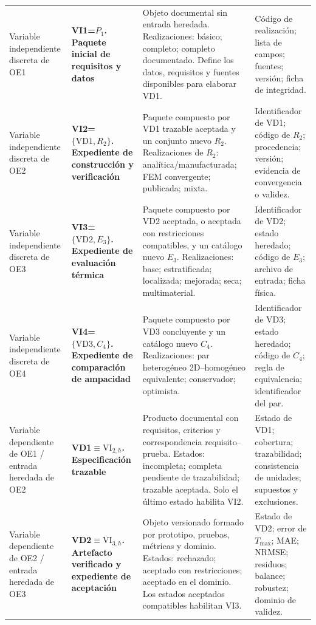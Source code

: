 \documentclass[11pt,a4paper,oneside]{report}
\newcommand{\Tmax}{T_{\max}}
\begin{document}
\begin{singlespace}
\begin{landscape}
\begin{longtable}{L{4.00cm}L{4.20cm}L{8.20cm}L{6.30cm}}
Variable independiente discreta de OE1 & \textbf{VI1=$P_1$. Paquete inicial de requisitos y datos} & Objeto documental sin entrada heredada. Realizaciones: básico; completo; completo documentado. Define los datos, requisitos y fuentes disponibles para elaborar VD1. & Código de realización; lista de campos; fuentes; versión; ficha de integridad. \\

Variable independiente discreta de OE2 & \textbf{VI2=$\{\mathrm{VD1},R_2\}$. Expediente de construcción y verificación} & Paquete compuesto por VD1 trazable aceptada y un conjunto nuevo $R_2$. Realizaciones de $R_2$: analítica/manufacturada; FEM convergente; publicada; mixta. & Identificador de VD1; código de $R_2$; procedencia; versión; evidencia de convergencia o validez. \\

Variable independiente discreta de OE3 & \textbf{VI3=$\{\mathrm{VD2},E_3\}$. Expediente de evaluación térmica} & Paquete compuesto por VD2 aceptada, o aceptada con restricciones compatibles, y un catálogo nuevo $E_3$. Realizaciones: base; estratificada; localizada; mejorada; seca; multimaterial. & Identificador de VD2; estado heredado; código de $E_3$; archivo de entrada; ficha física. \\

Variable independiente discreta de OE4 & \textbf{VI4=$\{\mathrm{VD3},C_4\}$. Expediente de comparación de ampacidad} & Paquete compuesto por VD3 concluyente y un catálogo nuevo $C_4$. Realizaciones: par heterogéneo 2D--homogéneo equivalente; conservador; optimista. & Identificador de VD3; estado heredado; código de $C_4$; regla de equivalencia; identificador del par. \\

Variable dependiente de OE1 / entrada heredada de OE2 & \textbf{VD1$\equiv\mathrm{VI}_{2,h}$. Especificación trazable} & Producto documental con requisitos, criterios y correspondencia requisito--prueba. Estados: incompleta; completa pendiente de trazabilidad; trazable aceptada. Solo el último estado habilita VI2. & Estado de VD1; cobertura; trazabilidad; consistencia de unidades; supuestos y exclusiones. \\

Variable dependiente de OE2 / entrada heredada de OE3 & \textbf{VD2$\equiv\mathrm{VI}_{3,h}$. Artefacto verificado y expediente de aceptación} & Objeto versionado formado por prototipo, pruebas, métricas y dominio. Estados: rechazado; aceptado con restricciones; aceptado en el dominio. Los estados aceptados compatibles habilitan VI3. & Estado de VD2; error de $\Tmax$; MAE; NRMSE; residuos; balance; robustez; dominio de validez. \\


\end{longtable}
\end{landscape}
\end{singlespace}
\end{document}
